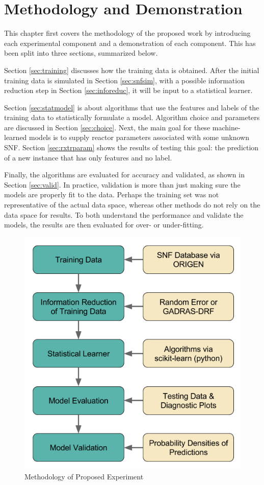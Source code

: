 \chapter{Methodology and Demonstration}
\label{ch:demo_method}

This chapter first covers the methodology of the proposed work by introducing
each experimental component and a demonstration of each component. This has been 
split into three sections, summarized below.

Section \ref{sec:training} discusses how the training data is obtained.  After
the initial training data is simulated in Section \ref{sec:snfsim}, with a
possible information reduction step in Section \ref{sec:inforeduc}, it will be
input to a statistical learner. 

Section \ref{sec:statmodel} is about algorithms that use the features and
labels of the training data to statistically formulate a model. Algorithm
choice and parameters are discussed in Section \ref{sec:choice}.  Next, the
main goal for these machine-learned models is to supply reactor parameters
associated with some unknown \gls{SNF}. Section \ref{sec:rxtrparam} shows the
results of testing this goal: the prediction of a new instance that has only
features and no label.  

Finally, the algorithms are evaluated for accuracy and validated, as shown
in Section \ref{sec:valid}. In practice, validation is more than just making sure the
models are properly fit to the data.  Perhaps the training set was not
representative of the actual data space, whereas other methods do not rely on
the data space for results. To both understand the performance and validate
the models, the results are then evaluated for over- or under-fitting. 

\begin{figure}[!htb]
  \centering
  \includegraphics[width=0.8\linewidth]{./chapters/demo_method/methodology.png}
  \caption{Methodology of Proposed Experiment}
  \label{fig:method}
\end{figure}

